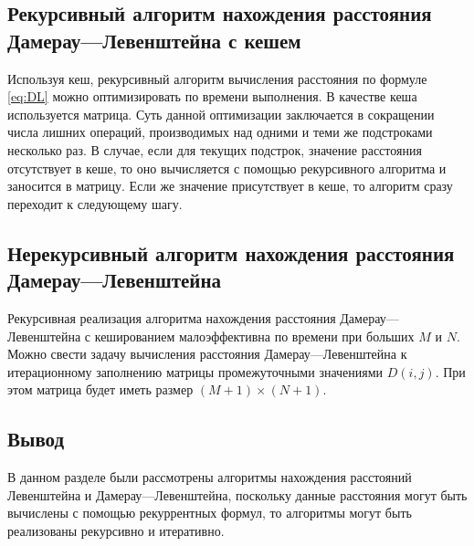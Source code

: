 \subsection{Рекурсивный алгоритм нахождения расстояния Дамерау---Левенштейна с кешем}

Используя кеш, рекурсивный алгоритм вычисления расстояния по формуле \eqref{eq:DL} можно оптимизировать по времени выполнения.  В качестве кеша используется матрица. Суть данной оптимизации заключается в сокращении числа лишних операций, производимых над одними и теми же подстроками несколько раз. В случае, если для текущих подстрок, значение расстояния отсутствует в кеше, то оно вычисляется с помощью рекурсивного алгоритма и заносится в матрицу. Если же значение присутствует в кеше, то алгоритм сразу переходит к следующему шагу.

\subsection{Нерекурсивный алгоритм нахождения расстояния Дамерау---Левенштейна}

Рекурсивная реализация алгоритма нахождения расстояния Дамерау---Левенштейна с кешированием малоэффективна по времени при больших $M$ и $N$. Можно свести задачу вычисления расстояния Дамерау---Левенштейна к итерационному заполнению матрицы промежуточными значениями $D(i, j)$. При этом матрица будет иметь размер $(M+1) \times (N+1)$.

\subsection*{Вывод}
В данном разделе были рассмотрены алгоритмы нахождения расстояний Левенштейна и Дамерау---Левенштейна, поскольку данные расстояния могут быть вычислены с помощью рекуррентных формул, то алгоритмы могут быть реализованы рекурсивно и итеративно. 



